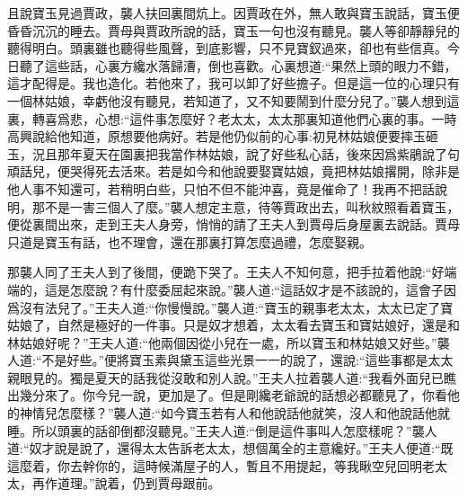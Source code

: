 \begin{parag}
    且說寶玉見過賈政，襲人扶回裏間炕上。因賈政在外，無人敢與寶玉說話，寶玉便昏昏沉沉的睡去。賈母與賈政所說的話，寶玉一句也沒有聽見。襲人等卻靜靜兒的聽得明白。頭裏雖也聽得些風聲，到底影響，只不見寶釵過來，卻也有些信真。今日聽了這些話，心裏方纔水落歸漕，倒也喜歡。心裏想道:“果然上頭的眼力不錯，這才配得是。我也造化。若他來了，我可以卸了好些擔子。但是這一位的心理只有一個林姑娘，幸虧他沒有聽見，若知道了，又不知要鬧到什麼分兒了。”襲人想到這裏，轉喜爲悲，心想:“這件事怎麼好？老太太，太太那裏知道他們心裏的事。一時高興說給他知道，原想要他病好。若是他仍似前的心事:初見林姑娘便要摔玉砸玉，況且那年夏天在園裏把我當作林姑娘，說了好些私心話，後來因爲紫鵑說了句頑話兒，便哭得死去活來。若是如今和他說要娶寶姑娘，竟把林姑娘撂開，除非是他人事不知還可，若稍明白些，只怕不但不能沖喜，竟是催命了！我再不把話說明，那不是一害三個人了麼。”襲人想定主意，待等賈政出去，叫秋紋照看着寶玉，便從裏間出來，走到王夫人身旁，悄悄的請了王夫人到賈母后身屋裏去說話。賈母只道是寶玉有話，也不理會，還在那裏打算怎麼過禮，怎麼娶親。
\end{parag}


\begin{parag}
    那襲人同了王夫人到了後間，便跪下哭了。王夫人不知何意，把手拉着他說:“好端端的，這是怎麼說？有什麼委屈起來說。”襲人道:“這話奴才是不該說的，這會子因爲沒有法兒了。”王夫人道:“你慢慢說。”襲人道:“寶玉的親事老太太，太太已定了寶姑娘了，自然是極好的一件事。只是奴才想着，太太看去寶玉和寶姑娘好，還是和林姑娘好呢？”王夫人道:“他兩個因從小兒在一處，所以寶玉和林姑娘又好些。”襲人道:“不是好些。”便將寶玉素與黛玉這些光景一一的說了，還說:“這些事都是太太親眼見的。獨是夏天的話我從沒敢和別人說。”王夫人拉着襲人道:“我看外面兒已瞧出幾分來了。你今兒一說，更加是了。但是剛纔老爺說的話想必都聽見了，你看他的神情兒怎麼樣？”襲人道:“如今寶玉若有人和他說話他就笑，沒人和他說話他就睡。所以頭裏的話卻倒都沒聽見。”王夫人道:“倒是這件事叫人怎麼樣呢？”襲人道:“奴才說是說了，還得太太告訴老太太，想個萬全的主意纔好。”王夫人便道:“既這麼着，你去幹你的，這時候滿屋子的人，暫且不用提起，等我瞅空兒回明老太太，再作道理。”說着，仍到賈母跟前。
\end{parag}


